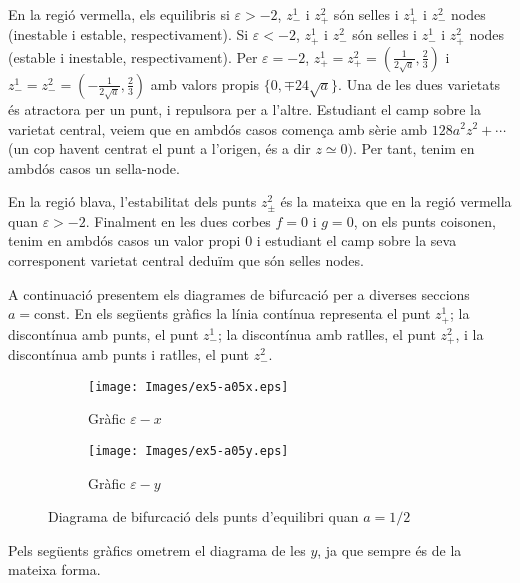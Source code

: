 \documentclass[a4paper]{article}
\theoremstyle{definition}
\begin{document}
En la regió vermella, els equilibris si $\varepsilon>-2$, $z_-^1$ i $z_+^2$ són selles i $z_+^1$ i $z_-^2$ nodes (inestable i estable, respectivament). Si $\varepsilon<-2$, $z_+^1$ i $z_-^2$ són selles i $z_-^1$ i $z_+^2$ nodes (estable i inestable, respectivament). Per $\varepsilon = -2$, $z_+^1=z_+^2=(\frac{1}{2\sqrt{a}},\frac{2}{3})$ i $z_-^1=z_-^2=(-\frac{1}{2\sqrt{a}},\frac{2}{3})$ amb valors propis $\{0,\mp 24\sqrt{a}\}$. Una de les dues varietats és atractora per un punt, i repulsora per a l'altre. Estudiant el camp sobre la varietat central, veiem que en ambdós casos comença amb sèrie amb $128a^2 z^2+\cdots$ (un cop havent centrat el punt a l'origen, és a dir $z\simeq 0)$. Per tant, tenim en ambdós casos un sella-node.

En la regió blava, l'estabilitat dels punts $z_\pm^2$ és la mateixa que en la regió vermella quan $\varepsilon > -2$. Finalment en les dues corbes $f=0$ i $g=0$, on els punts co\lgem isonen, tenim en ambdós casos un valor propi 0 i estudiant el camp sobre la seva corresponent varietat central deduïm que són selles nodes.

A continuació presentem els diagrames de bifurcació per a diverses seccions $a=\mathrm{const}$. En els següents gràfics la línia contínua representa el punt $z_+^1$; la discontínua amb punts, el punt $z_-^1$; la discontínua amb ratlles, el punt $z_+^2$, i la discontínua amb punts i ratlles, el punt $z_-^2$.

\begin{figure}[ht]
  \captionsetup[subfigure]{justification=centering}
  \centering
  \begin{subfigure}[b]{0.4\linewidth}
    \centering
    \texttt{[image: Images/ex5-a05x.eps]}
    \caption{Gràfic $\varepsilon - x$}
  \end{subfigure}
  \hfill
  \begin{subfigure}[b]{0.4\linewidth}
    \centering
    \texttt{[image: Images/ex5-a05y.eps]}
    \caption{Gràfic $\varepsilon - y$}
  \end{subfigure}
  \caption{Diagrama de bifurcació dels punts d'equilibri quan $a=1/2$}
\end{figure}

Pels següents gràfics ometrem el diagrama de les $y$, ja que sempre és de la mateixa forma.
\end{document}

